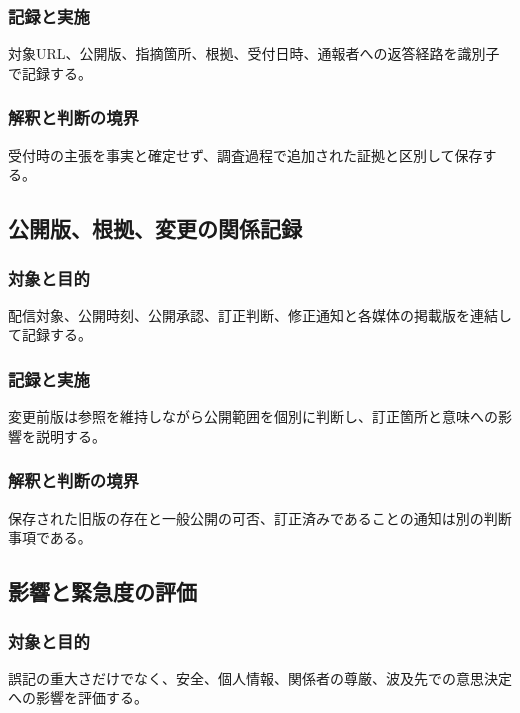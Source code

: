 \documentclass[a4paper,11pt]{article}
\begin{document}
\subsubsection{記録と実施}
\par 対象URL、公開版、指摘箇所、根拠、受付日時、通報者への返答経路を識別子で記録する。\par\medskip
\subsubsection{解釈と判断の境界}
\par 受付時の主張を事実と確定せず、調査過程で追加された証拠と区別して保存する。\par\medskip
\subsection{公開版、根拠、変更の関係記録}
\subsubsection{対象と目的}
\par 配信対象、公開時刻、公開承認、訂正判断、修正通知と各媒体の掲載版を連結して記録する。\par\medskip
\subsubsection{記録と実施}
\par 変更前版は参照を維持しながら公開範囲を個別に判断し、訂正箇所と意味への影響を説明する。\par\medskip
\subsubsection{解釈と判断の境界}
\par 保存された旧版の存在と一般公開の可否、訂正済みであることの通知は別の判断事項である。\par\medskip
\subsection{影響と緊急度の評価}
\subsubsection{対象と目的}
\par 誤記の重大さだけでなく、安全、個人情報、関係者の尊厳、波及先での意思決定への影響を評価する。\par\medskip
\end{document}
